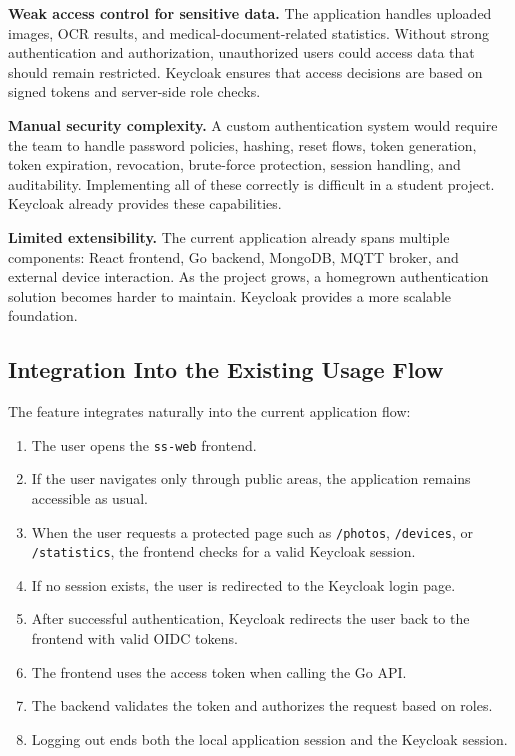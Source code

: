 \documentclass[conference]{IEEEtran}
\begin{document}
\textbf{Weak access control for sensitive data.} The application handles uploaded images, OCR results, and medical-document-related statistics. Without strong authentication and authorization, unauthorized users could access data that should remain restricted. Keycloak ensures that access decisions are based on signed tokens and server-side role checks.

\textbf{Manual security complexity.} A custom authentication system would require the team to handle password policies, hashing, reset flows, token generation, token expiration, revocation, brute-force protection, session handling, and auditability. Implementing all of these correctly is difficult in a student project. Keycloak already provides these capabilities.

\textbf{Limited extensibility.} The current application already spans multiple components: React frontend, Go backend, MongoDB, MQTT broker, and external device interaction. As the project grows, a homegrown authentication solution becomes harder to maintain. Keycloak provides a more scalable foundation.

\subsection{Integration Into the Existing Usage Flow}

The feature integrates naturally into the current application flow:

\begin{enumerate}
\item The user opens the \texttt{ss-web} frontend.
\item If the user navigates only through public areas, the application remains accessible as usual.
\item When the user requests a protected page such as \texttt{/photos}, \texttt{/devices}, or \texttt{/statistics}, the frontend checks for a valid Keycloak session.
\item If no session exists, the user is redirected to the Keycloak login page.
\item After successful authentication, Keycloak redirects the user back to the frontend with valid OIDC tokens.
\item The frontend uses the access token when calling the Go API.
\item The backend validates the token and authorizes the request based on roles.
\item Logging out ends both the local application session and the Keycloak session.
\end{enumerate}
\end{document}
